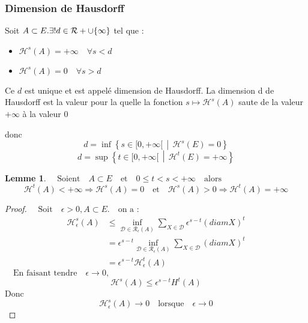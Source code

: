 \documentclass[12pt,a4paper]{report}
\theoremstyle{plain}
\theoremstyle{plain}
\newtheorem{lemme}[theo]{Lemme}
\theoremstyle{definition}
\theoremstyle{remark}
\newcommand{\enstq}[2]{\left\{#1\,\middle|\,#2\right\}}
\newcommand{\R}[1]{\mathcal{R}}
\newcommand{\textm}[1]{\quad \text{#1} \quad}
\begin{document}
\subsubsection*{Dimension de Hausdorff}
Soit $A \subset E. \exists !d \in \R_+\cup \{\infty\}$ tel que :
\begin{itemize}
\item $\mathcal{H}^s(A) = + \infty \quad \forall s<d$
\item $\mathcal{H}^s(A)=0 \quad \forall s>d$
\end{itemize}
Ce $d$ est unique et est appelé dimension de Hausdorff. La dimension d de Hausdorff est la valeur pour la quelle la fonction $s \mapsto \mathcal{H}^s(A)$ saute de la valeur $+ \infty$ à la valeur $0$

donc 
\[d = \inf \enstq{s \in [0, +\infty[}{\mathcal{H}^s(E)=0}\]
\[d = \sup \enstq{t \in [0, +\infty[}{\mathcal{H}^t(E)=+\infty}\]

\begin{lemme}
$\textm{Soient} A \subset E \textm{et} 0\leq t <s<+\infty \textm{alors}$
\[\mathcal{H}^t(A) <+ \infty \Rightarrow \mathcal{H}^s (A)=0 \textm{et} \mathcal{H}^s(A)>0 \Rightarrow \mathcal{H}^t(A) = + \infty\]
\end{lemme}

\begin{proof}
$\textm{Soit} \epsilon > 0, A \subset E. \textm{on a :}$
\begin{equation*}\label{xx}
\begin{split}
\mathcal{H}^s_\epsilon (A)& \leq \inf_{\mathcal{D \in \mathcal{R}_\epsilon} (A)} \sum_{X \in \mathcal{D}} \epsilon ^{s-t} (diam X)^t \\
& = \epsilon^{s-t} \inf_{\mathcal{D \in \mathcal{R}_\epsilon} (A)} \sum_{X \in \mathcal{D}} (diam X)^t \\
& = \epsilon^{s-t} \mathcal{H}^t_\epsilon (A)
\end{split}
\end{equation*}
$\textm{En faisant tendre} \epsilon\rightarrow 0,$
\[\mathcal{H}^s (A) \leq \epsilon ^{s-t} H^t (A)\]
Donc \[\mathcal{H}^s _{\epsilon} (A) \rightarrow 0 \textm{lorsque} \epsilon \rightarrow 0\]


\end{proof}
\end{document}

